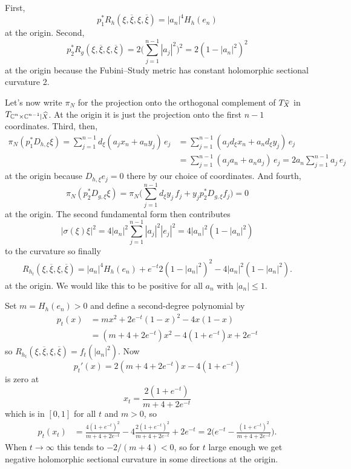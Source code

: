\documentclass[10pt,a4paper]{amsart}
\newcommand{\kk}[1]{\mathbb{#1}}
\def\ov#1{\overline{#1}}
\def\hsc{holomorphic sectional curvature}
\def\bl#1{\widehat{#1}}
\def\blX{\bl{X}}
\begin{document}
First,
$$
p_1^*R_h(\xi, \ov\xi, \xi, \ov\xi)
= |a_n|^4 H_h(e_n)
$$
at the origin. Second,
$$
p_2^*R_g(\xi, \ov\xi, \xi, \ov\xi)
= 2 \biggl(\sum_{j=1}^{n-1} |a_j|^2\biggr)^2
= 2(1 - |a_n|^2)^2
$$
at the origin
because the Fubini--Study metric has constant \hsc{} 2.

Let's now write $\pi_N$ for the projection onto the orthogonal complement of
$T_{\smash{\blX}}$ in $T_{\smash{\kk C^n \times \kk C^{n-1}|\blX}}$.
At the origin it is just the projection onto the first $n-1$ coordinates.
Third, then,
\begin{align*}
\pi_N(p_1^*D_{h,\xi} \xi)
= \sum_{j=1}^{n-1} d_{\xi}(a_j x_n + a_n y_j) \, e_j
&= \sum_{j=1}^{n-1} (a_j d_{\xi}x_n + a_n d_{\xi} y_j) \, e_j
\\
&= \sum_{j=1}^{n-1} (a_j a_n + a_n a_j ) \, e_j
= 2 a_n \sum_{j=1}^{n-1} a_j \, e_j
\end{align*}
at the origin
because $D_{h,\xi} e_j = 0$ there by our choice of coordinates.
And fourth,
$$
\pi_N(p_2^*D_{g,\xi} \xi)
= \pi_N \biggl( \sum_{j=1}^{n-1} d_\xi y_j \, f_j + y_j p_2^*D_{g,\xi} f_j \biggr) = 0
$$
at the origin.
The second fundamental form then contributes
$$
|\sigma(\xi)\xi|^2
= 4 |a_n|^2 \sum_{j=1}^{n-1} |a_j|^2 |e_j|^2
= 4 |a_n|^2(1 - |a_n|^2)
$$
to the curvature
so finally
\begin{align*}
R_{h_t}(\xi, \ov\xi, \xi, \ov\xi)
= |a_n|^4 H_h(e_n)
+ e^{-t} 2(1 - |a_n|^2)^2
- 4 |a_n|^2(1 - |a_n|^2).
\end{align*}
at the origin.
We would like this to be positive for all $a_n$ with $|a_n| \leq 1$.

Set $m = H_h(e_n) > 0$ and define a second-degree polynomial by
\begin{align*}
p_t(x)
&= m x^2 + 2 e^{-t} (1-x)^2 - 4x(1-x)
\\
&= (m + 4 + 2e^{-t})x^2 - 4(1 + e^{-t})x + 2e^{-t}
\end{align*}
so $R_{h_t}(\xi, \ov\xi, \xi, \ov\xi) = f_t(|a_n|^2)$.
Now
$$
p_t'(x)
= 2(m+4+2e^{-t})x - 4(1 + e^{-t})
$$
is zero at
$$
x_t = \frac{2(1 + e^{-t})}{m + 4 + 2e^{-t}}
$$
which is in $[0,1]$ for all $t$ and $m > 0$, so
\begin{align*}
p_t(x_t)
&= \frac{4(1 + e^{-t})^2}{m + 4 + 2e^{-t}}
- 4\frac{2(1 + e^{-t})^2}{m + 4 + 2e^{-t}}
+ 2e^{-t}
=
2\biggl(
e^{-t}
- \frac{(1 + e^{-t})^2}{m + 4 + 2e^{-t}}
\biggr).
\end{align*}
When $t \to \infty$ this tends to $-2/(m+4) < 0$, so for $t$ large enough we
get negative \hsc{} in some directions at the origin.





\end{document}
